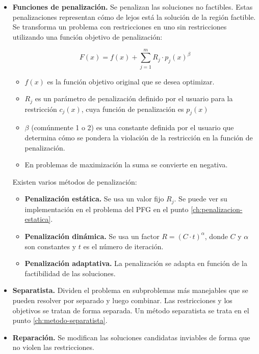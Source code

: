 \begin{itemize}
  \item \textbf{Funciones de penalización.} Se penalizan las soluciones no factibles. Estas penalizaciones representan cómo de lejos está la solución de la región factible. Se transforma un problema con restricciones en uno sin restricciones utilizando una función objetivo de penalización:
  
  \[
  F(x) = f(x) + \sum_{j=1}^{m} R_j \cdot p_j(x)^\beta
  \]
  
  \begin{itemize}
    \item \( f(x) \) es la función objetivo original que se desea optimizar.
    \item \( R_j \) es un parámetro de penalización definido por el usuario para la restricción \( c_j(x) \), cuya función de penalización es \( p_j(x) \)
    \item \( \beta \) (comúnmente 1 o 2) es una constante definida por el usuario que determina cómo se pondera la violación de la restricción en la función de penalización.
    \item En problemas de maximización la suma se convierte en negativa.     
  \end{itemize}

  \newpage
  Existen varios métodos de penalización:
  
    \begin{itemize}
      \item \textbf{Penalización estática.} Se usa un valor fijo \( R_j \). Se puede ver su implementación en el problema del PFG en el punto \ref{ch:penalizacion-estatica}.
      \item \textbf{Penalización dinámica.} Se usa un factor \( R = (C \cdot t) ^ {\alpha} \), donde \( C \) y \( \alpha \) son constantes y \( t \) es el número de iteración.
      \item \textbf{Penalización adaptativa.} La penalización se adapta en función de la factibilidad de las soluciones.
    \end{itemize}
  \item \textbf{Separatista.} Dividen el problema en subproblemas más manejables que se pueden resolver por separado y luego combinar. Las restricciones y los objetivos se tratan de forma separada. Un método separatista se trata en el punto \ref{ch:metodo-separatista}.

  \item \textbf{Reparación.} Se modifican las soluciones candidatas inviables de forma que no violen las restricciones.
\end{itemize}

